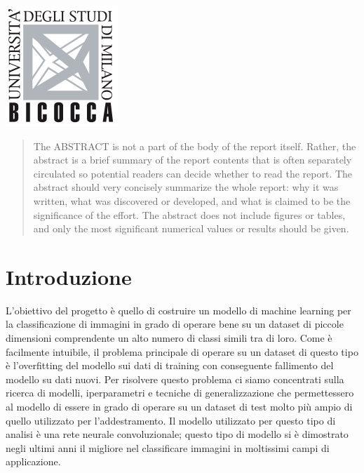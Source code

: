 \begin{titlepage}

\includegraphics{logo.png}\\[1cm] %
 

\vfill %

\end{titlepage}


\begin{abstract}
The ABSTRACT is not a part of the body of the report itself. Rather, the abstract is a brief summary of the report contents that is often separately circulated so potential readers can decide whether to read the report. The abstract should very concisely summarize the whole report: why it was written, what was discovered or developed, and what is claimed to be the significance of the effort. The abstract does not include figures or tables, and only the most significant numerical values or results should be given.
\end{abstract}

\section{Introduzione}
L'obiettivo del progetto è quello di costruire un modello di machine learning per la classificazione di immagini in grado di operare bene su un dataset di piccole dimensioni comprendente un alto numero di classi simili tra di loro.
Come è facilmente intuibile, il problema principale di operare su un dataset di questo tipo è l'overfitting del modello sui dati di training con conseguente fallimento del modello su dati nuovi. Per risolvere questo problema ci siamo concentrati sulla ricerca di modelli, iperparametri e tecniche di generalizzazione che permettessero al modello di essere in grado di operare su un dataset di test molto più ampio di quello utilizzato per l'addestramento.
Il modello utilizzato per questo tipo di analisi è una rete neurale convoluzionale; questo tipo di modello si è dimostrato negli ultimi anni il migliore nel classificare immagini in moltissimi campi di applicazione.

